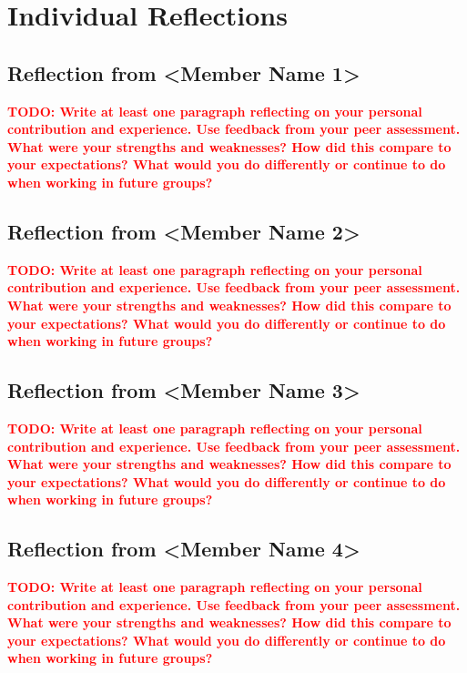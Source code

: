 \documentclass[11pt]{article}
\newcommand{\todo}[1]{\textcolor{red}{\textbf{TODO: #1}}}
\begin{document}
\section{Individual Reflections}
\subsection{Reflection from <Member Name 1>}
\todo{Write at least one paragraph reflecting on your personal contribution and experience. Use feedback from your peer assessment. What were your strengths and weaknesses? How did this compare to your expectations? What would you do differently or continue to do when working in future groups?}

\subsection{Reflection from <Member Name 2>}
\todo{Write at least one paragraph reflecting on your personal contribution and experience. Use feedback from your peer assessment. What were your strengths and weaknesses? How did this compare to your expectations? What would you do differently or continue to do when working in future groups?}

\subsection{Reflection from <Member Name 3>}
\todo{Write at least one paragraph reflecting on your personal contribution and experience. Use feedback from your peer assessment. What were your strengths and weaknesses? How did this compare to your expectations? What would you do differently or continue to do when working in future groups?}

\subsection{Reflection from <Member Name 4>}
\todo{Write at least one paragraph reflecting on your personal contribution and experience. Use feedback from your peer assessment. What were your strengths and weaknesses? How did this compare to your expectations? What would you do differently or continue to do when working in future groups?}
\end{document}
